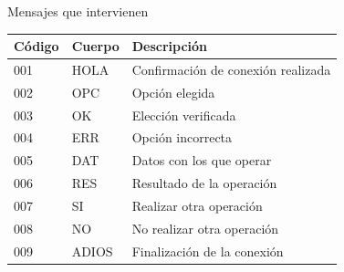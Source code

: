 \documentclass[spanish]{beamer}
\begin{document}
\begin{frame}{Mensajes que intervienen}
	\begin{table}[]
\centering
\label{my-label}
\begin{tabular}{lll}
\hline
\multicolumn{1}{|l|}{Código} & \multicolumn{1}{l|}{Cuerpo} & \multicolumn{1}{l|}{Descripción}   \\ \hline
001                          & HOLA                        & Confirmación de conexión realizada \\
002                          & OPC                         & Opción elegida                     \\
003                          & OK                          & Elección verificada                \\
004                          & ERR                         & Opción incorrecta                  \\
005                          & DAT                         & Datos con los que operar           \\
006                          & RES                         & Resultado de la operación          \\
007                          & SI                          & Realizar otra operación            \\
008                          & NO                          & No realizar otra operación         \\
009                          & ADIOS                       & Finalización de la conexión       
\end{tabular}
\end{table}
\end{frame}
\end{document}
